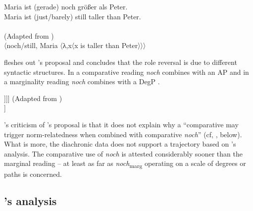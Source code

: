 \documentclass[output=paper]{langsci/langscibook}
\begin{document}
\ea\gll Maria ist (gerade) noch größer als Peter.\\
       Maria ist {(just/barely)} still taller than Peter.\\
 \label{NOCH_MARG_EXP} \\
\ex  (Adapted from \citealt[ex. 47']{koenig1977}) \\
     〈noch/still, Maria 〈λ,x〈x is taller than Peter〉〉〉 \label{koenigs_noch_marg}
\z

\noindent\citet{umbach2009a_comp} fleshes out \citeauthor{koenig1977}'s \citeyearpar{koenig1977} proposal and concludes that the role reversal is due to different syntactic structures. In a comparative reading \textit{noch} combines with an AP  and in a marginality reading \textit{noch} combines with a DegP .

\begin{exe}
\label{NOCH_COMP_EXPPrime}\relax [$_{\textnormal{\footnotesize{CP}}}$ Maria [$_{\textnormal{\footnotesize{VP}}}$ ist [$_{\textnormal{\footnotesize{DegP}}}$ \textbf{[$_{\textbf{\footnotesize{AP}}}$ noch [$_{\textbf{\footnotesize{AP}}}$ größer ]]} [als Adam]]]]
 (Adapted from \citealt[ex. 17b, 18b]{umbach2009a_comp})\label{NOCH_MARG_EXPPrime}\\\relax [$_{\textnormal{\footnotesize{CP}}}$ Maria [$_{\textnormal{\footnotesize{VP}}}$ ist \textbf{[$_{\textbf{\footnotesize{DegP}}}$ noch [$_{\textbf{\footnotesize{DegP}}}$ [$_{\textbf{\footnotesize{AP}}}$ größer] [als Peter]]]} ]] 
\end{exe}


\noindent\citeauthor{umbach2009a_comp}'s \citeyearpar{umbach2009a_comp} criticism of \citeauthor{koenig1977}'s \citeyearpar{koenig1977} proposal is that it does not explain why a ``comparative may trigger norm-relatedness when combined with comparative \textit{noch}'' (cf, , below). What is more, the diachronic data does not support a trajectory based on \citeauthor{koenig1977}'s analysis. The comparative use of \textit{noch} is attested considerably sooner than the marginal reading -- at least as far as \textit{noch}\textsubscript{marg} operating on a scale of degrees or paths is concerned.

\subsection{\citeauthor{umbach2009a_comp}'s \citeyearpar{umbach2009a_comp} analysis} \label{SubSec_umbach_analysis}
\end{document}
